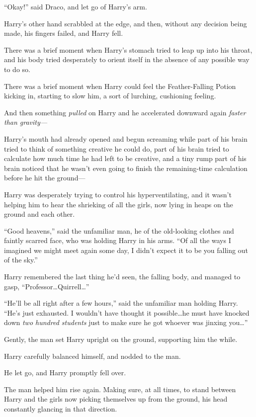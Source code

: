 “Okay!” said Draco, and let go of Harry’s arm.

Harry’s other hand scrabbled at the edge, and then, without any decision being made, his fingers failed, and Harry fell.

There was a brief moment when Harry’s stomach tried to leap up into his throat, and his body tried desperately to orient itself in the absence of any possible way to do so.

There was a brief moment when Harry could feel the Feather-Falling Potion kicking in, starting to slow him, a sort of lurching, cushioning feeling.

And then something \emph{pulled} on Harry and he accelerated downward again \emph{faster than gravity—}

Harry’s mouth had already opened and begun screaming while part of his brain tried to think of something creative he could do, part of his brain tried to calculate how much time he had left to be creative, and a tiny rump part of his brain noticed that he wasn’t even going to finish the remaining-time calculation before he hit the ground—

\later

Harry was desperately trying to control his hyperventilating, and it wasn’t helping him to hear the shrieking of all the girls, now lying in heaps on the ground and each other.

“Good heavens,” said the unfamiliar man, he of the old-looking clothes and faintly scarred face, who was holding Harry in his arms. “Of all the ways I imagined we might meet again some day, I didn’t expect it to be you falling out of the sky.”

Harry remembered the last thing he’d seen, the falling body, and managed to gasp, “Professor…Quirrell…”

“He’ll be all right after a few hours,” said the unfamiliar man holding Harry. “He’s just exhausted. I wouldn’t have thought it possible…he must have knocked down \emph{two hundred students} just to make sure he got whoever was jinxing you…”

Gently, the man set Harry upright on the ground, supporting him the while.

Harry carefully balanced himself, and nodded to the man.

He let go, and Harry promptly fell over.

The man helped him rise again. Making sure, at all times, to stand between Harry and the girls now picking themselves up from the ground, his head constantly glancing in that direction.

